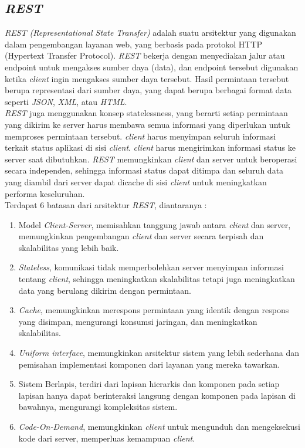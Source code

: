 \subsection{\textit{REST}}
\textit{REST (Representational State Transfer)} adalah suatu arsitektur yang digunakan dalam pengembangan layanan web, yang berbasis pada protokol HTTP (Hypertext Transfer Protocol). \textit{REST} bekerja dengan menyediakan jalur atau endpoint untuk mengakses sumber daya (data), dan endpoint tersebut digunakan ketika \textit{client} ingin mengakses sumber daya tersebut. Hasil permintaan tersebut berupa representasi dari sumber daya, yang dapat berupa berbagai format data seperti \textit{JSON}, \textit{XML}, atau \textit{HTML}\cite{2}.\\
\textit{REST} juga menggunakan konsep statelessness, yang berarti setiap permintaan yang dikirim ke server harus membawa semua informasi yang diperlukan untuk memproses permintaan tersebut. \textit{client} harus menyimpan seluruh informasi terkait status aplikasi di sisi \textit{client}. \textit{client} harus mengirimkan informasi status ke server saat dibutuhkan. \textit{REST} memungkinkan \textit{client} dan server untuk beroperasi secara independen, sehingga informasi status dapat ditimpa dan seluruh data yang diambil dari server dapat dicache di sisi \textit{client} untuk meningkatkan performa keseluruhan\cite{2}.\\
Terdapat 6 batasan dari arsitektur \textit{REST}, diantaranya\cite{6} :
\begin{enumerate}[nolistsep,leftmargin=0.5cm]
\item Model \textit{Client-Server}, memisahkan tanggung jawab antara \textit{client} dan server, memungkinkan pengembangan \textit{client} dan server secara terpisah dan skalabilitas yang lebih baik.
\item \textit{Stateless}, komunikasi tidak memperbolehkan server menyimpan informasi tentang \textit{client}, sehingga meningkatkan skalabilitas tetapi juga meningkatkan data yang berulang dikirim dengan permintaan.
\item \textit{Cache}, memungkinkan merespons permintaan yang identik dengan respons yang disimpan, mengurangi konsumsi jaringan, dan meningkatkan skalabilitas.
\item \textit{Uniform interface}, memungkinkan arsitektur sistem yang lebih sederhana dan pemisahan implementasi komponen dari layanan yang mereka tawarkan.
\item Sistem Berlapis, terdiri dari lapisan hierarkis dan komponen pada setiap lapisan hanya dapat berinteraksi langsung dengan komponen pada lapisan di bawahnya, mengurangi kompleksitas sistem.
\item \textit{Code-On-Demand}, memungkinkan \textit{client} untuk mengunduh dan mengeksekusi kode dari server, memperluas kemampuan \textit{client}.
\\
\end{enumerate}


